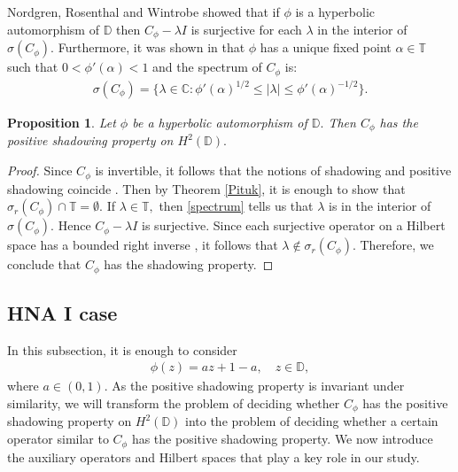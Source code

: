 \documentclass[11pt]{amsart}
\theoremstyle{plain}
\newtheorem{proposition}[definition]{Proposition}
\theoremstyle{remark}
\theoremstyle{plain}
\begin{document}
Nordgren, Rosenthal and Wintrobe \cite[Corollary 5.9]{MR899654} showed that if $\phi$ is a hyperbolic automorphism of $\mathbb{D}$ then $C_{\phi}-\lambda I$ is surjective for each $\lambda$  in the interior of $\sigma(C_{\phi}).$
Furthermore, it was shown in \cite[Theorem 7.4]{Cowen} that $\phi$ has a unique fixed point $\alpha\in \mathbb{T}$ such that $0<\phi'(\alpha)<1$ and the spectrum of $C_{\phi}$  is:
\begin{align}\label{spectrum}
\sigma(C_{\phi})=\{\lambda\in \mathbb{C}:\phi'(\alpha)^{1/2}\leq |\lambda|\leq \phi'(\alpha)^{-1/2}\}.
\end{align}


\begin{proposition}\label{hyperbolic automorphism} Let $\phi$ be a hyperbolic automorphism of $\mathbb{D}.$ Then $C_{\phi}$ has the positive shadowing property on $H^2(\mathbb{D}).$
\end{proposition}

\begin{proof} Since $C_{\phi}$ is invertible, it follows that the notions of shadowing and positive shadowing coincide \cite[Theorem 1]{Bernardes_Alfred_Shadowing2024}. Then by Theorem \ref{Pituk}, it is enough  to show that $\sigma_r(C_{\phi})\cap\mathbb{T}=\emptyset.$ If $\lambda \in \mathbb{T},$ then \eqref{spectrum} tells us that $\lambda$ is in the interior of $\sigma(C_{\phi}).$ Hence $C_{\phi}-\lambda I$ is surjective. Since each surjective operator on a Hilbert space has a bounded right inverse \cite[Chap. XI, Proposition 1.1, p. 347]{MR1070713}, it follows that $\lambda\notin \sigma_r(C_{\phi}).$ Therefore, we conclude that $C_{\phi}$ has the shadowing property.
\end{proof}



\subsection{HNA I case}  In this subsection, it is enough to consider
\begin{align}\label{hyperbolic-non}
\phi(z)=az+1-a,\quad z\in \mathbb{D},
\end{align}
where $a\in (0,1)$. As the positive shadowing property is invariant under similarity, we will transform the problem of deciding whether $C_{\phi}$ has the positive shadowing property on $H^2(\mathbb{D})$ into the problem of deciding whether a certain operator similar to $C_{\phi}$ has the positive shadowing property. We now introduce the auxiliary operators and
Hilbert spaces that play a key role in our study.
\end{document}
